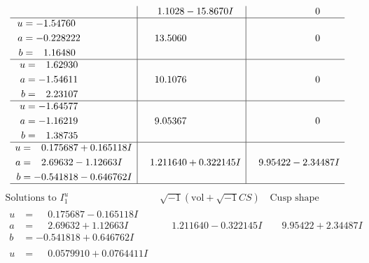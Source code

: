 \documentclass[1p]{elsarticle_modified}
\theoremstyle{definition}
\newcommand{\I}{\sqrt{-1}}
\begin{document}
$$\begin{array}{c|c|c}
 & \phantom{-}1.1028 - 15.8670 I & \phantom{-0.000000 } 0 \\ \hline\begin{aligned}
u &= -1.54760\phantom{ +0.000000I} \\
a &= -0.228222\phantom{ +0.000000I} \\
b &= \phantom{-}1.16480\phantom{ +0.000000I}\end{aligned}
 & \phantom{-}13.5060\phantom{ +0.000000I} & \phantom{-0.000000 } 0 \\ \hline\begin{aligned}
u &= \phantom{-}1.62930\phantom{ +0.000000I} \\
a &= -1.54611\phantom{ +0.000000I} \\
b &= \phantom{-}2.23107\phantom{ +0.000000I}\end{aligned}
 & \phantom{-}10.1076\phantom{ +0.000000I} & \phantom{-0.000000 } 0 \\ \hline\begin{aligned}
u &= -1.64577\phantom{ +0.000000I} \\
a &= -1.16219\phantom{ +0.000000I} \\
b &= \phantom{-}1.38735\phantom{ +0.000000I}\end{aligned}
 & \phantom{-}9.05367\phantom{ +0.000000I} & \phantom{-0.000000 } 0 \\ \hline\begin{aligned}
u &= \phantom{-}0.175687 + 0.165118 I \\
a &= \phantom{-}2.69632 - 1.12663 I \\
b &= -0.541818 - 0.646762 I\end{aligned}
 & \phantom{-}1.211640 + 0.322145 I & \phantom{-}9.95422 - 2.34487 I\\
 \hline 
 \end{array}$$\newpage$$\begin{array}{c|c|c}  
\text{Solutions to }I^u_{1}& \I (\text{vol} + \sqrt{-1}CS) & \text{Cusp shape}\\
 \hline 
\begin{aligned}
u &= \phantom{-}0.175687 - 0.165118 I \\
a &= \phantom{-}2.69632 + 1.12663 I \\
b &= -0.541818 + 0.646762 I\end{aligned}
 & \phantom{-}1.211640 - 0.322145 I & \phantom{-}9.95422 + 2.34487 I \\ \hline\begin{aligned}
u &= \phantom{-}0.0579910 + 0.0764411 I \\

\end{aligned}
\end{array}$$
\end{document}
